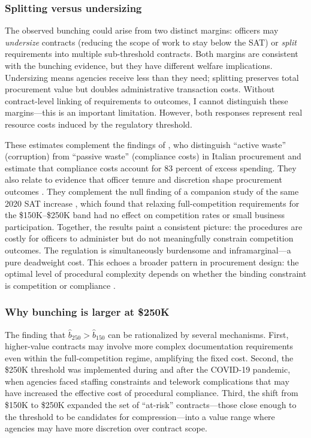 \documentclass[12pt]{article}
\begin{document}
\subsubsection*{Splitting versus undersizing} The observed bunching could arise from two distinct margins: officers may \textit{undersize} contracts (reducing the scope of work to stay below the SAT) or \textit{split} requirements into multiple sub-threshold contracts. Both margins are consistent with the bunching evidence, but they have different welfare implications. Undersizing means agencies receive less than they need; splitting preserves total procurement value but doubles administrative transaction costs. Without contract-level linking of requirements to outcomes, I cannot distinguish these margins---this is an important limitation. However, both responses represent real resource costs induced by the regulatory threshold.

These estimates complement the findings of \citet{bandiera2009}, who distinguish ``active waste'' (corruption) from ``passive waste'' (compliance costs) in Italian procurement and estimate that compliance costs account for 83 percent of excess spending. They also relate to evidence that officer tenure and discretion shape procurement outcomes \citep{coviello2018, decarolis2018}. They complement the null finding of a companion study of the same 2020 SAT increase \citep{apep0759}, which found that relaxing full-competition requirements for the \$150K--\$250K band had no effect on competition rates or small business participation. Together, the results paint a consistent picture: the procedures are costly for officers to administer but do not meaningfully constrain competition outcomes. The regulation is simultaneously burdensome and inframarginal---a pure deadweight cost. This echoes a broader pattern in procurement design: the optimal level of procedural complexity depends on whether the binding constraint is competition \citep{bulow1996, tadelis2012, bajari2014} or compliance \citep{liebman2018, athey2013}.

\subsubsection*{Why bunching is larger at \$250K} The finding that $\hat{b}_{250} > \hat{b}_{150}$ can be rationalized by several mechanisms. First, higher-value contracts may involve more complex documentation requirements even within the full-competition regime, amplifying the fixed cost. Second, the \$250K threshold was implemented during and after the COVID-19 pandemic, when agencies faced staffing constraints and telework complications that may have increased the effective cost of procedural compliance. Third, the shift from \$150K to \$250K expanded the set of ``at-risk'' contracts---those close enough to the threshold to be candidates for compression---into a value range where agencies may have more discretion over contract scope.
\end{document}
